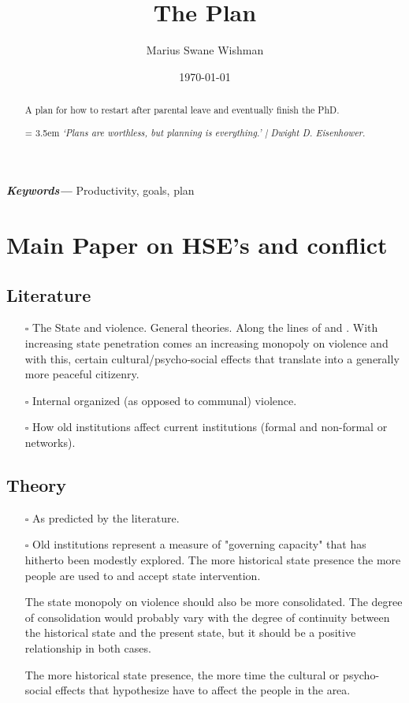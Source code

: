 \documentclass[12pt]{article}
\title{The Plan}
\author[1]{Marius Swane Wishman}
\affil[1]{Department of Sociology and Political Science, NTNU}
\date{\today}
\providecommand{\keywords}[1]
{
	\small	
	\textbf{\textit{Keywords---}} #1
}
\begin{document}
\maketitle

\begin{abstract}
	A plan for how to restart after parental leave and eventually finish the
	PhD.

\bigskip
\hangindent = 3.5em
\emph{`Plans are worthless, but planning is everything.' | 
		Dwight D. Eisenhower.
	}
\end{abstract}

\bigskip
\keywords{Productivity, goals, plan}

\pagebreak


\onehalfspacing

\section{Main Paper on HSE's and conflict}
\subsection{Literature}
\begin{itemize}
	\item[$\square$] The State and violence. General theories.
		Along the lines of \citet{Pinker2012} and \citet{Tilly1990}.
		With increasing state penetration comes an increasing monopoly
		on violence \citep{Tilly1990} and with this, certain
		cultural/psycho-social effects that translate into a generally
		more peaceful citizenry.
	\item[$\square$] Internal organized (as opposed to communal) violence.
	\item[$\square$] How old institutions affect current institutions
		(formal and non-formal or networks).
\end{itemize}

\subsection{Theory}
\begin{itemize}
	\item[$\square$] As predicted by the literature.
	\item[$\square$] Old institutions represent a measure of "governing
		capacity" that has hitherto been modestly explored. The more
		historical state presence the more people are used to and accept
		state intervention. 

		The state monopoly on violence should also be more consolidated.
		The degree of consolidation would probably vary with the degree
		of continuity between the historical state and the present
		state, but it should be a positive relationship in both cases. 

		The more historical state presence, the more time the cultural or
		psycho-social effects that \citet{Pinker2012} hypothesize have
		to affect the people in the area.
\end{itemize}
\end{document}
